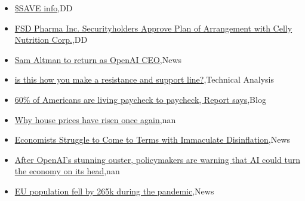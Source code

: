 \documentclass{article}%
\begin{document}
%
\begin{itemize}%
\item%
\href{https://reddit.com/r/wallstreetbets/comments/1814ug9/save\_info/}{\$SAVE info},DD%
\item%
\href{https://reddit.com/r/Baystreetbets/comments/180it8m/fsd\_pharma\_inc\_securityholders\_approve\_plan\_of/}{FSD Pharma Inc. Securityholders Approve Plan of Arrangement with Celly Nutrition Corp.},DD%
\item%
\href{https://reddit.com/r/StockMarket/comments/1812soz/sam\_altman\_to\_return\_as\_openai\_ceo/}{Sam Altman to return as OpenAI CEO},News%
\item%
\href{https://reddit.com/r/StockMarket/comments/180st84/is\_this\_how\_you\_make\_a\_resistance\_and\_support\_line/}{is this how you make a resistance and support line?},Technical Analysis%
\item%
\href{https://reddit.com/r/Economics/comments/1812xbr/60\_of\_americans\_are\_living\_paycheck\_to\_paycheck/}{60\% of Americans are living paycheck to paycheck, Report says},Blog%
\item%
\href{https://reddit.com/r/Economics/comments/180xt6t/why\_house\_prices\_have\_risen\_once\_again/}{Why house prices have risen once again},nan%
\item%
\href{https://reddit.com/r/Economics/comments/180vqvm/economists\_struggle\_to\_come\_to\_terms\_with/}{Economists Struggle to Come to Terms with Immaculate Disinflation},News%
\item%
\href{https://reddit.com/r/Economics/comments/180ug5e/after\_openais\_stunning\_ouster\_policymakers\_are/}{After OpenAI's stunning ouster, policymakers are warning that AI could turn the economy on its head},nan%
\item%
\href{https://reddit.com/r/Economics/comments/180tpwi/eu\_population\_fell\_by\_265k\_during\_the\_pandemic/}{EU population fell by 265k during the pandemic},News%
\end{itemize}%
\end{document}
